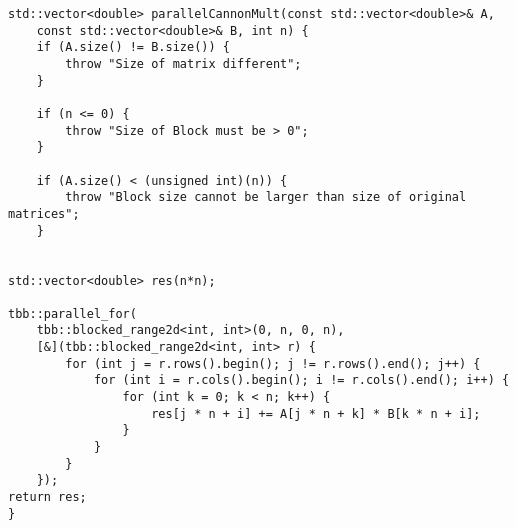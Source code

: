 \documentclass{report}
\begin{document}
\begin{lstlisting}
std::vector<double> parallelCannonMult(const std::vector<double>& A,
    const std::vector<double>& B, int n) {
    if (A.size() != B.size()) {
        throw "Size of matrix different";
    }

    if (n <= 0) {
        throw "Size of Block must be > 0";
    }

    if (A.size() < (unsigned int)(n)) {
        throw "Block size cannot be larger than size of original matrices";
    }


std::vector<double> res(n*n);

tbb::parallel_for(
    tbb::blocked_range2d<int, int>(0, n, 0, n),
    [&](tbb::blocked_range2d<int, int> r) {
        for (int j = r.rows().begin(); j != r.rows().end(); j++) {
            for (int i = r.cols().begin(); i != r.cols().end(); i++) {
                for (int k = 0; k < n; k++) {
                    res[j * n + i] += A[j * n + k] * B[k * n + i];
                }
            }
        }
    });
return res;
}

\end{lstlisting}
\end{document}
